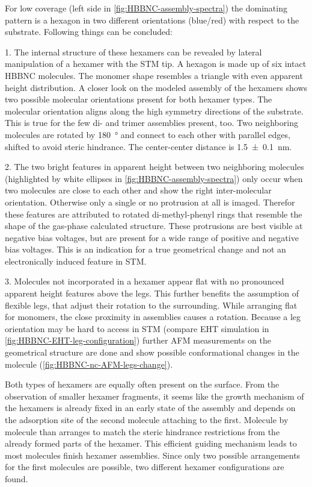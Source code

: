 For low coverage (left side in \autoref{fig:HBBNC-assembly-spectra}) the dominating pattern is a hexagon in two different orientations (blue/red) with respect to the substrate.  Following things can be concluded: 

1. The internal structure of these hexamers can be revealed by lateral manipulation of a hexamer with the STM tip. A hexagon is made up of six intact HBBNC molecules. The monomer shape resembles a triangle with even apparent height distribution. A closer look on the modeled assembly of the hexamers shows two possible molecular orientations present for both hexamer types. The molecular orientation aligns along the high symmetry directions of the substrate. This is true for the few di- and trimer assemblies present, too. Two neighboring molecules are rotated by \SI{180}{\degree} and connect to each other with parallel edges, shifted to avoid steric hindrance. The center-center distance is \SI{1.5 \pm 0.1}{\nano \meter}. 

2. The two bright features in apparent height between two neighboring molecules (highlighted by white ellipses in \autoref{fig:HBBNC-assembly-spectra}) only occur when two molecules are close to each other and show the right inter-molecular orientation. Otherwise only a single or no protrusion at all is imaged. Therefor these features are attributed to rotated di-methyl-phenyl rings that resemble the shape of the gas-phase calculated structure. These protrusions are best visible at negative bias voltages, but are present for a wide range of positive and negative bias voltages. This is an indication for a true geometrical change and not an electronically induced feature in STM.

3. Molecules not incorporated in a hexamer appear flat with no pronounced apparent height features above the legs. This further benefits the assumption of flexible legs, that adjust their rotation to the surrounding. While arranging flat for monomers, the close proximity in assemblies causes a rotation. Because a leg orientation may be hard to access in STM (compare EHT simulation in \autoref{fig:HBBNC-EHT-leg-configuration}) further AFM measurements on the geometrical structure are done and show possible conformational changes in the molecule (\autoref{fig:HBBNC-nc-AFM-legs-change}).

Both types of hexamers are equally often present on the surface. From the observation of smaller hexamer fragments, it seems like the growth mechanism of the hexamers is already fixed in an early state of the assembly and depends on the adsorption site of the second molecule attaching to the first. Molecule by molecule than arranges to match the steric hindrance restrictions from the already formed parts of the hexamer. This efficient guiding mechanism leads to most molecules finish hexamer assemblies. Since only two possible arrangements for the first molecules are possible, two different hexamer configurations are found.

